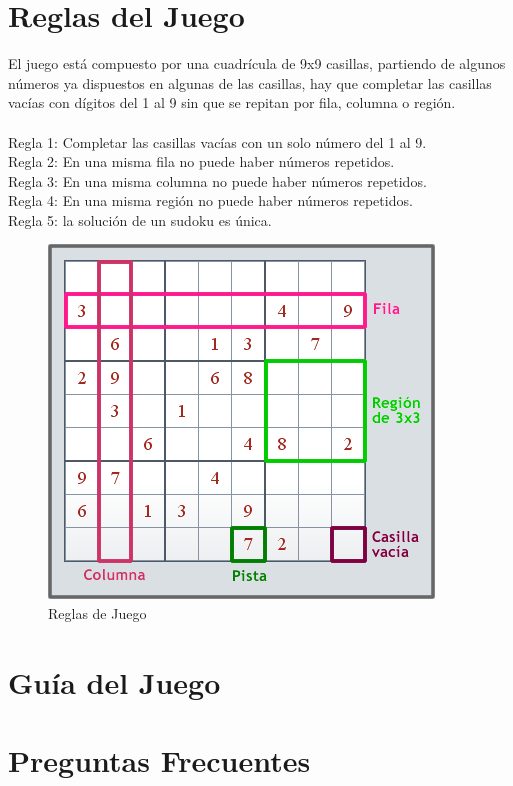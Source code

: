 \documentclass[12pt,oneside]{book}
\begin{document}
\chapter{Reglas del Juego}
El juego está compuesto por una cuadrícula de 9x9 casillas, partiendo de algunos números ya dispuestos en algunas de las casillas, hay que completar las casillas vacías con dígitos del 1 al 9 sin que se repitan por fila, columna o región. \\ \\ Regla 1: Completar las casillas vacías con un solo número del 1 al 9. \\ Regla 2: En una misma fila no puede haber números repetidos. \\ Regla 3: En una misma columna no puede haber números repetidos. \\ Regla 4: En una misma región no puede haber números repetidos. \\ Regla 5: la solución de un sudoku es única.

\begin{figure}[htbp]
\begin{center}
\includegraphics[width=.50\textwidth]{./imagenes/Reglas.png}
\caption{Reglas de Juego}
\label{Reglas}
\end{center}
\end{figure}

\chapter{Guía del Juego}





\chapter{Preguntas Frecuentes}
\end{document}
